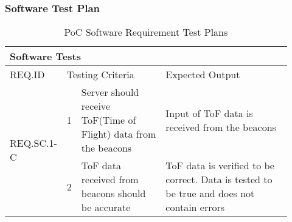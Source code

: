 \subsubsection{Software Test Plan}

\begin{table}[h!]
    \centering
    \begin{tabular}{|m{0.15\linewidth}|m{0.02\linewidth}|m{0.3\linewidth}|m{0.45\linewidth}|} 
    \hline
    \multicolumn{4}{|l|}{Software Tests }           \\ 
    \hline
    REQ.ID      & \multicolumn{2}{l|}{Testing Criteria}      & Expected Output          \\ 
    \hline
    \multirow{2}{*}{REQ.SC.1-C} & 1 
    & Server should receive ToF(Time of Flight) data from the beacons
    & Input of ToF data is received from the beacons        \\ 
    \cline{2-4}
    & 2 
    & ToF data received from beacons should be accurate  
    & ToF data is verified to be correct. Data is tested to be true and does not contain errors   \\
    \hline 
\end{tabular}
	\caption{PoC Software Requirement Test Plans}
\end{table}


